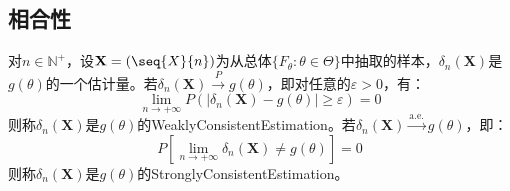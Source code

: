 \subsection{相合性}
\begin{definition}
	对$n\in\mathbb{N}^+$，设$\mathbf{X}=(\seq{X}{n})$为从总体$\{F_\theta:\theta\in\Theta\}$中抽取的样本，$\delta_n(\mathbf{X})$是$g(\theta)$的一个估计量。若$\delta_n(\mathbf{X})\overset{P}{\longrightarrow}g(\theta)$，即对任意的$\varepsilon>0$，有：
	\begin{equation*}
		\lim_{n\to+\infty}P(|\delta_n(\mathbf{X})-g(\theta)|\geqslant\varepsilon)=0
	\end{equation*}
	则称$\delta_n(\mathbf{X})$是$g(\theta)$的\gls{WeaklyConsistentEstimation}。若$\delta_n(\mathbf{X})\overset{\text{a.e.}}{\longrightarrow}g(\theta)$，即：
	\begin{equation*}
		P\left[\lim_{n\to+\infty}\delta_n(\mathbf{X})\ne g(\theta)\right]=0
	\end{equation*}
	则称$\delta_n(\mathbf{X})$是$g(\theta)$的\gls{StronglyConsistentEstimation}。
\end{definition}